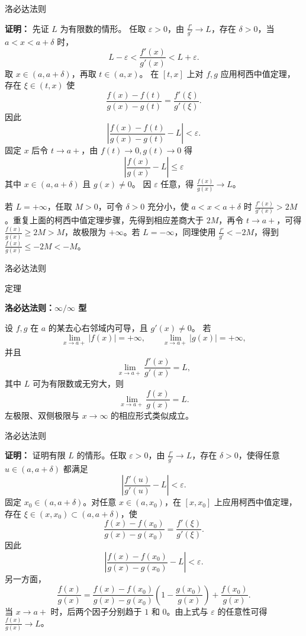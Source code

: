 \documentclass[aspectratio=169,10pt,fontset=fandol]{ctexbeamer}
\begin{document}
\begin{frame}[t,fragile]{洛必达法则}
\footnotesize
{\footnotesize
\textbf{证明：}
先证 $L$ 为有限数的情形。 任取 $\varepsilon>0$，由 $\frac{f'}{g'}\to L$，存在 $\delta>0$，当 $a<x<a+\delta$ 时，
\[
L-\varepsilon<\frac{f'(x)}{g'(x)}<L+\varepsilon.
\]
取 $x\in(a,a+\delta)$，再取 $t\in(a,x)$。 在 $[t,x]$ 上对 $f,g$ 应用柯西中值定理，存在 $\xi\in(t,x)$ 使
\[
\frac{f(x)-f(t)}{g(x)-g(t)}=\frac{f'(\xi)}{g'(\xi)}.
\]
因此
\[
\left|\frac{f(x)-f(t)}{g(x)-g(t)}-L\right|<\varepsilon.
\]
固定 $x$ 后令 $t\to a+$，由 $f(t)\to0,g(t)\to0$ 得
\[
\left|\frac{f(x)}{g(x)}-L\right|\leq\varepsilon
\]
其中 $x\in(a,a+\delta)$ 且 $g(x)\neq0$。 因 $\varepsilon$ 任意，得 $\frac{f(x)}{g(x)}\to L$。

若 $L=+\infty$，任取 $M>0$，可令 $\delta>0$ 充分小，使 $a<x<a+\delta$ 时 $\frac{f'(x)}{g'(x)}>2M$。重复上面的柯西中值定理步骤，先得到相应差商大于 $2M$，再令 $t\to a+$，可得 $\frac{f(x)}{g(x)}\geq2M>M$，故极限为 $+\infty$。若 $L=-\infty$，同理使用 $\frac{f'}{g'}<-2M$，得到 $\frac{f(x)}{g(x)}\leq-2M<-M$。

}
\end{frame}
\begin{frame}[t,fragile]{洛必达法则}
\footnotesize
\begin{block}{定理}
{\footnotesize
\textbf{洛必达法则：$\infty/\infty$ 型}\par

设 $f,g$ 在 $a$ 的某去心右邻域内可导，且 $g'(x)\neq0$。 若
\[
\lim_{x\to a+}|f(x)|=+\infty,\qquad
\lim_{x\to a+}|g(x)|=+\infty,
\]
并且
\[
\lim_{x\to a+}\frac{f'(x)}{g'(x)}=L,
\]
其中 $L$ 可为有限数或无穷大，则
\[
\lim_{x\to a+}\frac{f(x)}{g(x)}=L.
\]
左极限、双侧极限与 $x\to\infty$ 的相应形式类似成立。

}
\end{block}
\end{frame}
\begin{frame}[t,fragile]{洛必达法则}
\footnotesize
{\footnotesize
\textbf{证明：}
证明有限 \(L\) 的情形。任取 \(\varepsilon>0\)，由 \(\frac{f'}{g'}\to L\)，存在 \(\delta>0\)，使得任意 \(u\in(a,a+\delta)\) 都满足
\[
\left|\frac{f'(u)}{g'(u)}-L\right|<\varepsilon.
\]
固定 \(x_0\in(a,a+\delta)\)。对任意 \(x\in(a,x_0)\)，在 \([x,x_0]\) 上应用柯西中值定理，存在 \(\xi\in(x,x_0)\subset(a,a+\delta)\)，使
\[
\frac{f(x)-f(x_0)}{g(x)-g(x_0)}=\frac{f'(\xi)}{g'(\xi)}.
\]
因此
\[
\left|\frac{f(x)-f(x_0)}{g(x)-g(x_0)}-L\right|<\varepsilon.
\]
另一方面，
\[
\frac{f(x)}{g(x)}
=\frac{f(x)-f(x_0)}{g(x)-g(x_0)}
\left(1-\frac{g(x_0)}{g(x)}\right)
+\frac{f(x_0)}{g(x)}.
\]
当 \(x\to a+\) 时，后两个因子分别趋于 \(1\) 和 \(0\)。由上式与 \(\varepsilon\) 的任意性可得 \(\frac{f(x)}{g(x)}\to L\)。


}
\end{frame}
\end{document}

